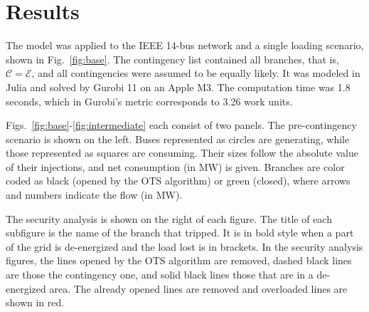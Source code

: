 \section{Results}
The model was applied to the IEEE 14-bus network and a single loading scenario, shown in Fig.~\ref{fig:base}. The contingency list contained all
branches, that is, $\mathcal{C}= \mathcal{E}$, and all contingencies were assumed to be equally likely. It was modeled in Julia and solved by Gurobi 11 on an Apple M3. The computation time was 1.8 seconds, which in Gurobi's metric corresponds to 3.26 work units.

Figs.~\ref{fig:base}-\ref{fig:intermediate} each consist of two panels. The pre-contingency scenario is shown on the left. 
Buses represented as circles are
generating, while those represented as squares are consuming. Their sizes follow
the absolute value of their injections, and net consumption (in MW) is given. Branches are color coded as black (opened by the OTS algorithm) or green (closed), where arrows and numbers indicate the flow (in MW). 

The security analysis is shown on the right of each figure. The title of each subfigure
is the name of the branch that tripped. It is in bold style when a part of the
grid is de-energized and the load lost is in brackets. 
In the security analysis figures, the lines opened
by the OTS algorithm are removed, dashed black lines are those the contingency one, and solid black lines those that are in a de-energized area. The already opened lines are removed and overloaded lines are shown in red.

